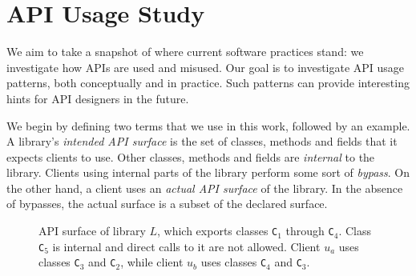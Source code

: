 \chapter{API Usage Study}
\label{sec:apiusage}
We aim to take a snapshot of where current software practices stand: we investigate how APIs are used and misused. Our goal is to investigate API usage patterns, both conceptually and in practice.
Such patterns can provide interesting hints for API designers in the future.

We begin by defining two terms that we use in this work, followed by an example. 
A library's \emph{intended API surface} is the set of
classes, methods and fields that it expects clients to use. Other
classes, methods and fields are \emph{internal} to the library. Clients using internal parts of the library perform
some sort of \emph{bypass}. On
the other hand, a client uses an \emph{actual API surface} of the
library. In the absence of bypasses, the actual surface is a subset of
the declared surface.


\begin{figure}[h]
 \begin{center}
  \caption{API surface of library $L$, which exports classes \texttt{C}$_1$ through \texttt{C}$_4$. Class \texttt{C}$_5$ is internal and direct calls to it are not allowed. Client $u_a$ uses classes \texttt{C}$_3$ and \texttt{C}$_2$, while client $u_b$ uses classes \texttt{C}$_4$ and \texttt{C}$_3$.}
  \label{fig:api-surface}
 \end{center}
\end{figure}



